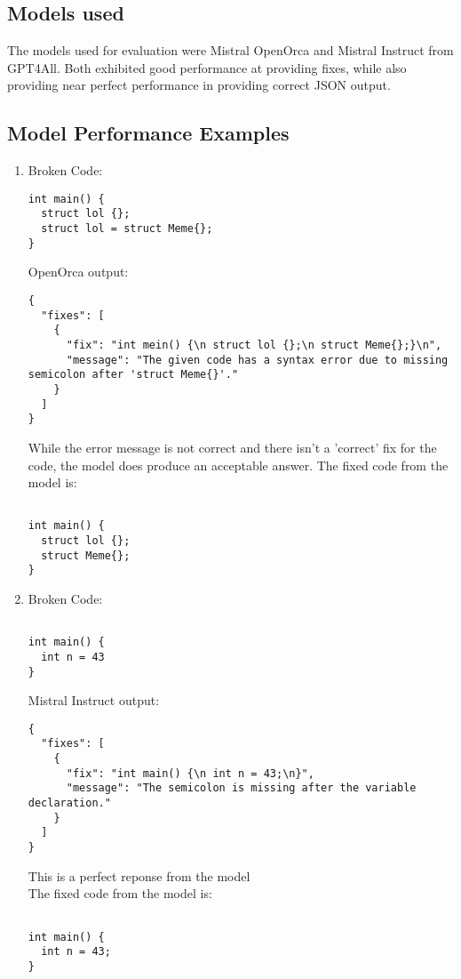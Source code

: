 \documentclass{article}
\begin{document}
	\subsection{Models used}
		The models used for evaluation were Mistral OpenOrca and Mistral Instruct from GPT4All. Both exhibited good performance at providing fixes, while also providing near perfect performance in providing correct JSON output.

	\subsection{Model Performance Examples}
		\begin{enumerate}
			\item
			Broken Code:
			\begin{verbatim}
int main() {
  struct lol {};
  struct lol = struct Meme{};
}
			\end{verbatim}
			OpenOrca output:
			\begin{verbatim}
{
  "fixes": [
    {
      "fix": "int mein() {\n struct lol {};\n struct Meme{};}\n",
      "message": "The given code has a syntax error due to missing semicolon after 'struct Meme{}'."
    }
  ]
}
			\end{verbatim}
			While the error message is not correct and there isn't a 'correct' fix for the code, the model does produce an acceptable answer.
			The fixed code from the model is:
			\begin{verbatim}

int main() {
  struct lol {};
  struct Meme{};
}
			\end{verbatim}


			\item
			Broken Code:
			\begin{verbatim}

int main() {
  int n = 43
}
			\end{verbatim}
			Mistral Instruct output:
			\begin{verbatim}
{
  "fixes": [
    {
      "fix": "int main() {\n int n = 43;\n}",
      "message": "The semicolon is missing after the variable declaration."
    }
  ]
}			\end{verbatim}
			This is a perfect reponse from the model \\
			The fixed code from the model is:
			\begin{verbatim}

int main() {
  int n = 43;
}
			\end{verbatim}


\end{enumerate}
\end{document}
